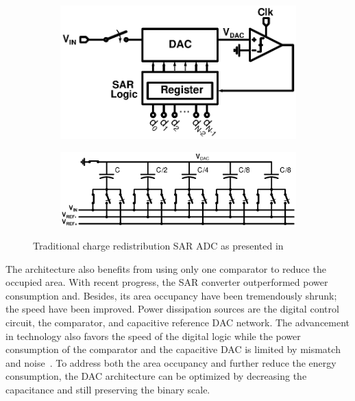 \begin{figure}[htp]
	\centering
	\begin{subfigure}[b]{0.44\textwidth}
		\includegraphics[width=\textwidth]{Chapter3/Figs/sar_principle.ps}
		\label{fig:sar_principle}
	\end{subfigure}
	\begin{subfigure}[b]{0.52\textwidth}
		\includegraphics[width=\textwidth]{Chapter3/Figs/sar_classic_dac.ps}
		\label{fig:sar_dac_classical}
	\end{subfigure}
	\caption{Traditional charge redistribution SAR ADC as presented in~\cite{McCreary1975}}
	\label{fig:sar_adc}
\end{figure}

The architecture also benefits from using only one comparator to reduce the occupied area. With recent progress, the SAR converter outperformed power consumption and. Besides, its area occupancy have been tremendously shrunk; the speed have been improved. Power dissipation sources are the digital control circuit, the comparator, and capacitive reference DAC network. The advancement in technology also favors the speed of the digital logic while the power consumption of the comparator and the capacitive DAC is limited by mismatch and noise~\cite{Yue2013,Mueller2013,Collins2017}. To address both the area occupancy and further reduce the energy consumption, the DAC architecture can be optimized by decreasing the capacitance and still preserving the binary scale.

